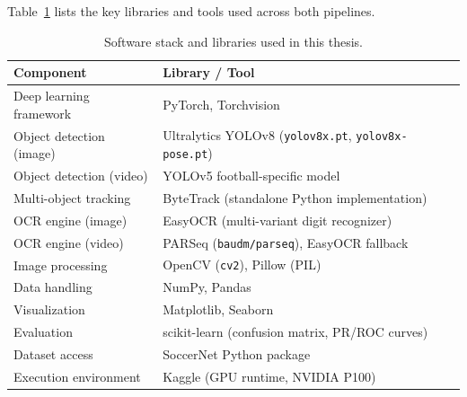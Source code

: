 Table~\ref{tab:software-stack} lists the key libraries and tools used
across both pipelines.

\begin{table}[H]
    \centering
    \caption{Software stack and libraries used in this thesis.}
    \label{tab:software-stack}
    \begin{tabular}{@{}ll@{}}
        \toprule
        \textbf{Component} & \textbf{Library / Tool} \\
        \midrule
        Deep learning framework & PyTorch, Torchvision \\
        Object detection (image) & Ultralytics YOLOv8 (\texttt{yolov8x.pt}, \texttt{yolov8x-pose.pt}) \\
        Object detection (video) & YOLOv5 football-specific model \\
        Multi-object tracking & ByteTrack (standalone Python implementation) \\
        OCR engine (image) & EasyOCR (multi-variant digit recognizer) \\
        OCR engine (video) & PARSeq (\texttt{baudm/parseq}), EasyOCR fallback \\
        Image processing & OpenCV (\texttt{cv2}), Pillow (PIL) \\
        Data handling & NumPy, Pandas \\
        Visualization & Matplotlib, Seaborn \\
        Evaluation & scikit-learn (confusion matrix, PR/ROC curves) \\
        Dataset access & SoccerNet Python package \\
        Execution environment & Kaggle (GPU runtime, NVIDIA P100) \\
        \bottomrule
    \end{tabular}
\end{table}
